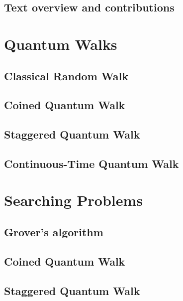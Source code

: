 \documentclass[
oneside,
11pt, a4paper,
footinclude=true,
headinclude=true,
cleardoublepage=empty
]{scrbook}
\begin{document}
\section{Text overview and contributions}


\chapter{Quantum Walks}\label{chap:QuantumWalks}

\section{Classical Random Walk}\label{sec:chap3ClassicalWalk}

\section{Coined Quantum Walk}\label{sec:chap3Coinedwalk}

\section{Staggered Quantum Walk}\label{sec:chap3StagWalk}

\section{Continuous-Time Quantum Walk}\label{sec:chap3Contwalk}



\chapter{Searching Problems}\label{chap:searchingProblems}
\section{Grover's algorithm}\label{sec:GrovSearchSimul}

\section{Coined Quantum Walk}\label{sec:CoinedSearchSimul}

\section{Staggered Quantum Walk}\label{sec:StagSearchSimul}

\end{document}
